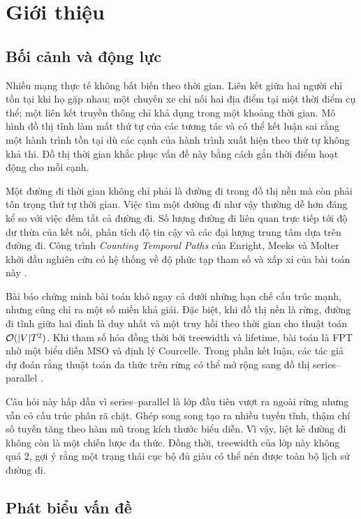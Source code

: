 \chapter{Giới thiệu}
\label{chap:introduction}

\section{Bối cảnh và động lực}

Nhiều mạng thực tế không bất biến theo thời gian. Liên kết giữa hai người chỉ tồn tại khi họ gặp nhau; một chuyến xe chỉ nối hai địa điểm tại một thời điểm cụ thể; một liên kết truyền thông chỉ khả dụng trong một khoảng thời gian. Mô hình đồ thị tĩnh làm mất thứ tự của các tương tác và có thể kết luận sai rằng một hành trình tồn tại dù các cạnh của hành trình xuất hiện theo thứ tự không khả thi. Đồ thị thời gian khắc phục vấn đề này bằng cách gắn thời điểm hoạt động cho mỗi cạnh.

Một đường đi thời gian không chỉ phải là đường đi trong đồ thị nền mà còn phải tôn trọng thứ tự thời gian. Việc tìm một đường đi như vậy thường dễ hơn đáng kể so với việc đếm tất cả đường đi. Số lượng đường đi liên quan trực tiếp tới độ dư thừa của kết nối, phân tích độ tin cậy và các đại lượng trung tâm dựa trên đường đi. Công trình \emph{Counting Temporal Paths} của Enright, Meeks và Molter khởi đầu nghiên cứu có hệ thống về độ phức tạp tham số và xấp xỉ của bài toán này \cite{enright2025}.

Bài báo chứng minh bài toán khó ngay cả dưới những hạn chế cấu trúc mạnh, nhưng cũng chỉ ra một số miền khả giải. Đặc biệt, khi đồ thị nền là rừng, đường đi tĩnh giữa hai đỉnh là duy nhất và một truy hồi theo thời gian cho thuật toán $\mathcal{O}(|V|T^2)$. Khi tham số hóa đồng thời bởi treewidth và lifetime, bài toán là FPT nhờ một biểu diễn MSO và định lý Courcelle. Trong phần kết luận, các tác giả dự đoán rằng thuật toán đa thức trên rừng có thể mở rộng sang đồ thị series--parallel \cite{enright2025}.

Câu hỏi này hấp dẫn vì series--parallel là lớp đầu tiên vượt ra ngoài rừng nhưng vẫn có cấu trúc phân rã chặt. Ghép song song tạo ra nhiều tuyến tĩnh, thậm chí số tuyến tăng theo hàm mũ trong kích thước biểu diễn. Vì vậy, liệt kê đường đi không còn là một chiến lược đa thức. Đồng thời, treewidth của lớp này không quá $2$, gợi ý rằng một trạng thái cục bộ đủ giàu có thể nén được toàn bộ lịch sử đường đi.

\section{Phát biểu vấn đề}

